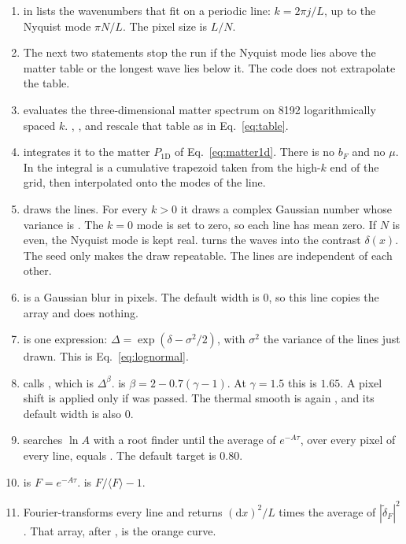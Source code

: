\documentclass[11pt]{article}
\begin{document}
\begin{enumerate}
\item {} in  lists the wavenumbers that fit on a periodic line: \(k=2\pi j/L\), up to the Nyquist mode \(\pi N/L\). The pixel size is \(L/N\).
\item The next two statements stop the run if the Nyquist mode lies above the matter table or the longest wave lies below it. The code does not extrapolate the table.
\item {} evaluates the three-dimensional matter spectrum on 8192 logarithmically spaced \(k\). , , and  rescale that table as in Eq.~\eqref{eq:table}.
\item {} integrates it to the matter \(P_{1\mathrm{D}}\) of Eq.~\eqref{eq:matter1d}. There is no \(b_F\) and no \(\mu\). In  the integral is a cumulative trapezoid taken from the high-\(k\) end of the grid, then interpolated onto the modes of the line.
\item {} draws the lines. For every \(k>0\) it draws a complex Gaussian number whose variance is . The \(k=0\) mode is set to zero, so each line has mean zero. If \(N\) is even, the Nyquist mode is kept real.  turns the waves into the contrast \(\delta(x)\). The seed only makes the draw repeatable. The lines are independent of each other.
\item {} is a Gaussian blur in pixels. The default width is 0, so this line copies the array and does nothing.
\item {} is one expression: \(\Delta=\exp(\delta-\sigma^2/2)\), with \(\sigma^2\) the variance of the lines just drawn. This is Eq.~\eqref{eq:lognormal}.
\item {} calls , which is \(\Delta^\beta\).  is \(\beta=2-0.7(\gamma-1)\). At \(\gamma=1.5\) this is \(1.65\). A pixel shift is applied only if  was passed. The thermal smooth is again , and its default width is also 0.
\item {} searches \(\ln A\) with a root finder until the average of \(e^{-A\tau}\), over every pixel of every line, equals . The default target is \(0.80\).
\item {} is \(F=e^{-A\tau}\).  is \(F/\langle F\rangle-1\).
\item {} Fourier-transforms every line and returns \((\mathrm{d}x)^2/L\) times the average of \(|\tilde\delta_F|^2\). That array, after , is the orange curve.
\end{enumerate}
\end{document}

